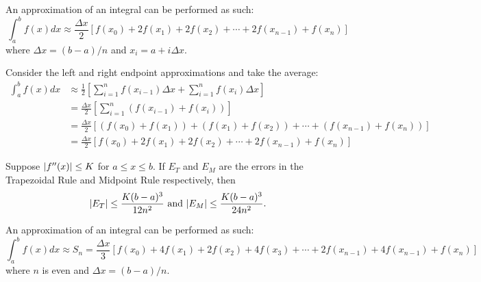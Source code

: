 \documentclass[a4paper,11pt]{article}
\begin{document}
\begin{outline}
    An approximation of an integral can be performed as such:
    \[
      \int_a^bf(x)dx \approx \frac{\Delta{x}}{2}\left[f(x_0)+2f(x_1)+2f(x_2)+\cdots+2f(x_{n-1})+f(x_n)\right]
    \]
    where \(\Delta{x} = (b-a)/n\) and \(x_i = a + i\Delta{x}\).
    
    \begin{justification}
      Consider the left and right endpoint approximations and take the average:
      \begin{align*}
        \int_a^bf(x)dx &\approx \frac{1}{2}\left[\sum_{i=1}^nf(x_{i-1})\Delta{x} + \sum_{i=1}^nf(x_i)\Delta{x}\right] \\
                       &= \frac{\Delta{x}}{2}\left[\sum_{i=1}^n (f(x_{i-1})+f(x_i))\right] \\
                       &= \frac{\Delta{x}}{2}\left[(f(x_0)+f(x_1)) + (f(x_1)+f(x_2)) + \cdots + (f(x_{n-1})+f(x_n))\right] \\
                       &= \frac{\Delta{x}}{2}\left[f(x_0)+2f(x_1)+2f(x_2)+\cdots+2f(x_{n-1})+f(x_n)\right]
      \end{align*}
    \end{justification}
    
    Suppose \(\lvert f''(x)\rvert \leq K\) for \(a \leq x \leq b\). If \(E_T\) and \(E_M\) are the errors in the 
    Trapezoidal Rule and Midpoint Rule respectively, then \[ \lvert E_T\rvert \leq \frac{K(b-a)^3}{12n^2}\text{ and }
    \lvert E_M\rvert \leq \frac{K(b-a)^3}{24n^2}\text{.} \]
    
    An approximation of an integral can be performed as such:
    \[
      \int_a^bf(x)dx \approx S_n = \frac{\Delta{x}}{3}\left[f(x_0) + 4f(x_1) + 2f(x_2) + 4f(x_3) + \cdots +
                                   2f(x_{n-1}) + 4f(x_{n-1}) + f(x_n)\right]
    \]
    where \(n\) is even and \(\Delta{x} = (b-a)/n\).
    

\end{outline}
\end{document}
